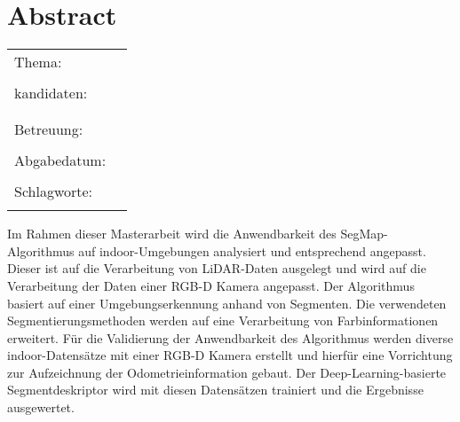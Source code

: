 \chapter*{Abstract}


\begin{center}
	\begingroup
	\renewcommand*{\arraystretch}{1}
	{\makeatletter	
		\begin{tabular}{p{3.2cm}p{9.6cm}}
			Thema: & \thema \\
			& \\
			\type kandidaten: & \verfasserA \\
							  & \verfasserB \\
			& \\
			Betreuung: & \hoschschule \newline \prueferA \newline \prueferB \\
			& \\
			Abgabedatum: & \abgabedatum \\
			& \\
			Schlagworte: & \schlagworte \\
			& \\
		\end{tabular}
	
	\makeatother}
	\endgroup
\end{center}

\bigskip

\noindent

Im Rahmen dieser Masterarbeit wird die Anwendbarkeit des SegMap-Algorithmus auf indoor-Umgebungen analysiert und entsprechend angepasst. Dieser ist auf die Verarbeitung von LiDAR-Daten ausgelegt und wird auf die Verarbeitung der Daten einer RGB-D Kamera angepasst. Der Algorithmus basiert auf einer Umgebungserkennung anhand von Segmenten. Die verwendeten Segmentierungsmethoden werden auf eine Verarbeitung von Farbinformationen erweitert. Für die Validierung der Anwendbarkeit des Algorithmus werden diverse indoor-Datensätze mit einer RGB-D Kamera erstellt und hierfür eine Vorrichtung zur Aufzeichnung der Odometrieinformation gebaut. Der Deep-Learning-basierte Segmentdeskriptor wird mit diesen Datensätzen trainiert und die Ergebnisse ausgewertet. 